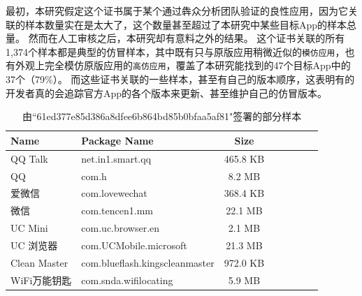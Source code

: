 最初，本研究假定这个证书属于某个通过犇众分析团队验证的良性应用，因为它关联的样本数量实在是太大了，这个数量甚至超过了本研究中某些目标App的样本总量。
然而在人工审核之后，本研究却有意料之外的结果。
这个证书关联的所有1,374个样本都是典型的仿冒样本，其中既有只与原版应用稍微近似的\texttt{模仿应用}，也有外观上完全模仿原版应用的\texttt{高仿应用}，覆盖了本研究能找到的47个目标App中的37个（79\%）。
而这些证书关联的一些样本，甚至有自己的版本顺序，这表明有的开发者真的会追踪官方App的各个版本来更新、甚至维护自己的仿冒版本。

\begin{table}[htbp]
    \renewcommand{\arraystretch}{1}
    \small
    \centering
    \caption{由``61ed377e85d386a8dfee6b864bd85b0bfaa5af81"签署的部分样本}
    \vspace{1mm}
    \begin{tabular}{l l c c c c c c}
        \toprule
        {\bf Name} & {\bf Package Name} & {\bf Size} \\
        \midrule
        QQ Talk  & net.in1.smart.qq & 465.8 KB \\
        QQ  & com.h & 8.2 MB \\
        爱微信  & com.lovewechat & 368.4 KB \\
        微信  & com.tencen1.mm & 22.1 MB \\
        UC Mini  & com.uc.browser.en & 2.1 MB \\
        UC 浏览器  & com.UCMobile.microsoft & 21.3 MB \\
        Clean Master  & com.blueflash.kingscleanmaster & 972.0 KB \\
        WiFi万能钥匙  & com.snda.wifilocating & 5.9 MB \\
        \bottomrule
    \end{tabular}
    \label{table:certificate_case_study}
\end{table}

